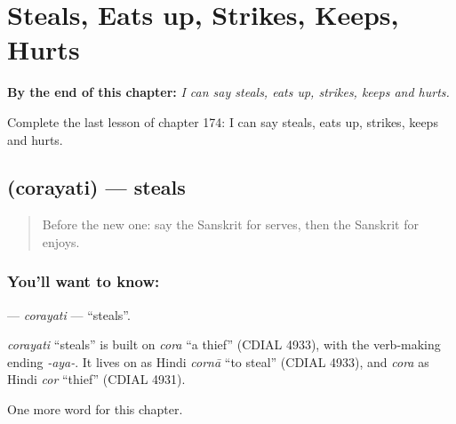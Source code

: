 
\chapter{Steals, Eats up, Strikes, Keeps, Hurts}
\label{ch:sa-steals-eats-up-strikes-keeps-hurts}

\begin{chapteropening}
\textbf{By the end of this chapter:} \emph{I can say steals, eats up, strikes, keeps and hurts.}

Complete the last lesson of chapter 174: I can say steals, eats up, strikes, keeps and hurts.
\end{chapteropening}

\section[\texorpdfstring{\sk{चोरयति} (corayati)}{चोरयति (corayati)}]{ (corayati) — steals}

\label{lesson:SA-C174-corayati}



\begin{quote}
Before the new one: say the Sanskrit for serves, then the Sanskrit for enjoys.
\end{quote}

\subsection*{You'll want to know: }
\textbf{} — \emph{corayati} — \textquotedblleft{}steals\textquotedblright{}.

\begin{cousinweb}
\emph{corayati} \textquotedblleft{}steals\textquotedblright{} is built on \emph{cora} \textquotedblleft{}a thief\textquotedblright{} (CDIAL 4933), with the verb-making ending \emph{-aya-}. It lives on as Hindi \emph{cornā} \textquotedblleft{}to steal\textquotedblright{} (CDIAL 4933), and \emph{cora} as Hindi \emph{cor} \textquotedblleft{}thief\textquotedblright{} (CDIAL 4931).
\end{cousinweb}

\begin{grammarlens}[title={What you've built}]
One more word for this chapter.
\end{grammarlens}

